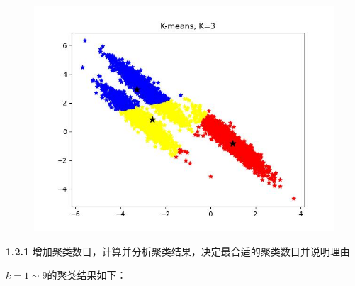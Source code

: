 \documentclass[UTF8]{ctexart}
\begin{document}
\begin{figure}[H]
  \centering
  \includegraphics[scale=0.46]{no3.jpg}
\end{figure}

\noindent \textbf{}

\noindent \textbf{1.2.1} 增加聚类数目，计算并分析聚类结果，决定最合适的聚类数目并说明理由

$k=1\sim9 $的聚类结果如下：
\end{document}
